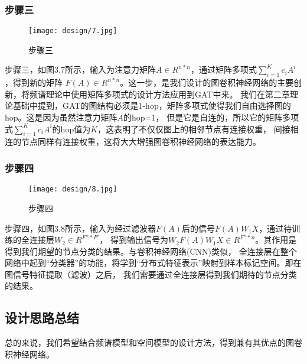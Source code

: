 \subsubsection{步骤三}
\begin{figure}[ht]
    \centering
    \texttt{[image: design/7.jpg]}
    \caption{\label{3-7}步骤三}
\end{figure}

步骤三，如图3.7所示，输入为注意力矩阵$A \in R^{n*n}$，通过矩阵多项式$ {\sum_{i=1}^{K}c_{i}A^{i}} $ ，得到新的矩阵
$F(A) \in R^{n*n}$。这一步，是我们设计的图卷积神经网络的主要创新，将频谱理论中使用矩阵多项式的设计方法应用到GAT中来。
我们在第二章理论基础中提到，GAT的图结构必须是1-hop，矩阵多项式使得我们自由选择图的hop。这是因为虽然注意力矩阵$A$的hop=1，
但是它是自连的，所以它的矩阵多项式$ {\sum_{i=1}^{K}c_{i}A^{i}} $的hop值为$K$，这表明了不仅仅图上的相邻节点有连接权重，
间接相连的节点同样有连接权重，这将大大增强图卷积神经网络的表达能力。

\subsubsection{步骤四}
\begin{figure}[ht]
    \centering
    \texttt{[image: design/8.jpg]}
    \caption{\label{3-8}步骤四}
\end{figure}

步骤四，如图3.8所示，输入为经过滤波器$ F(A) $后的信号$ F(A)W_{1}X $，通过待训练的全连接层$ W_2 \in R^{F''*F'} $，
得到输出信号为$ W_{2}F(A)W_{1}X \in R^{F''*n} $。其作用是得到我们期望的节点分类的结果。与卷积神经网络(CNN)类似，
全连接层在整个网络中起到“分类器”的功能，将学到“分布式特征表示”映射到样本标记空间。即在图信号特征提取（滤波）之后，
我们需要通过全连接层得到我们期待的节点分类的结果。

\subsection{设计思路总结}
总的来说，我们希望结合频谱模型和空间模型的设计方法，得到兼有其优点的图卷积神经网络。

